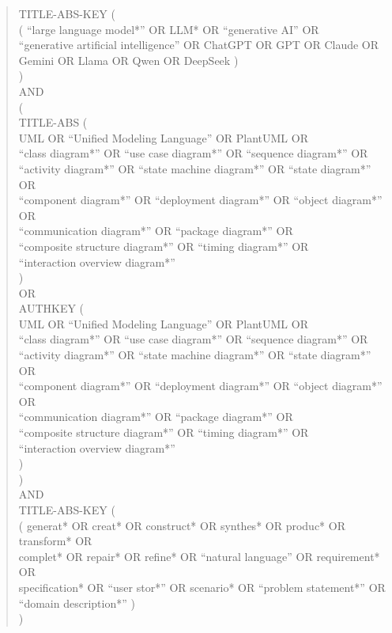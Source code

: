 \begin{quote}
\begin{minipage}{0.96\textwidth}
\scriptsize\ttfamily\raggedright
TITLE-ABS-KEY (\\
\quad ( ``large language model*'' OR LLM* OR ``generative AI'' OR\\
\quad ``generative artificial intelligence'' OR ChatGPT OR GPT OR Claude OR\\
\quad Gemini OR Llama OR Qwen OR DeepSeek )\\
)\\
AND\\
(\\
\quad TITLE-ABS (\\
\qquad UML OR ``Unified Modeling Language'' OR PlantUML OR\\
\qquad ``class diagram*'' OR ``use case diagram*'' OR ``sequence diagram*'' OR\\
\qquad ``activity diagram*'' OR ``state machine diagram*'' OR ``state diagram*'' OR\\
\qquad ``component diagram*'' OR ``deployment diagram*'' OR ``object diagram*'' OR\\
\qquad ``communication diagram*'' OR ``package diagram*'' OR\\
\qquad ``composite structure diagram*'' OR ``timing diagram*'' OR\\
\qquad ``interaction overview diagram*''\\
\quad )\\
\quad OR\\
\quad AUTHKEY (\\
\qquad UML OR ``Unified Modeling Language'' OR PlantUML OR\\
\qquad ``class diagram*'' OR ``use case diagram*'' OR ``sequence diagram*'' OR\\
\qquad ``activity diagram*'' OR ``state machine diagram*'' OR ``state diagram*'' OR\\
\qquad ``component diagram*'' OR ``deployment diagram*'' OR ``object diagram*'' OR\\
\qquad ``communication diagram*'' OR ``package diagram*'' OR\\
\qquad ``composite structure diagram*'' OR ``timing diagram*'' OR\\
\qquad ``interaction overview diagram*''\\
\quad )\\
)\\
AND\\
TITLE-ABS-KEY (\\
\quad ( generat* OR creat* OR construct* OR synthes* OR produc* OR transform* OR\\
\quad complet* OR repair* OR refine* OR ``natural language'' OR requirement* OR\\
\quad specification* OR ``user stor*'' OR scenario* OR ``problem statement*'' OR\\
\quad ``domain description*'' )\\
)
\end{minipage}
\end{quote}

